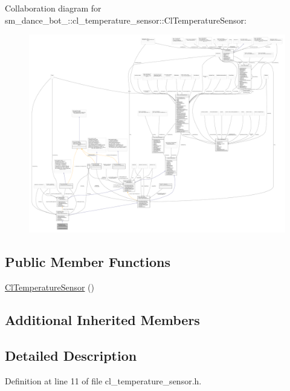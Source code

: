 Collaboration diagram for sm\+\_\+dance\+\_\+bot\+\_\+:\+:cl\+\_\+temperature\+\_\+sensor\+:\+:Cl\+Temperature\+Sensor\+:
\nopagebreak
\begin{figure}[H]
\begin{center}
\leavevmode
\includegraphics[width=350pt]{classsm__dance__bot__2_1_1cl__temperature__sensor_1_1ClTemperatureSensor__coll__graph}
\end{center}
\end{figure}
\subsection*{Public Member Functions}
\begin{DoxyCompactItemize}
\item 
\hyperlink{classsm__dance__bot__2_1_1cl__temperature__sensor_1_1ClTemperatureSensor_ac7c33050a8330c985eaf7a7539d9ea55}{Cl\+Temperature\+Sensor} ()
\end{DoxyCompactItemize}
\subsection*{Additional Inherited Members}


\subsection{Detailed Description}


Definition at line 11 of file cl\+\_\+temperature\+\_\+sensor.\+h.



